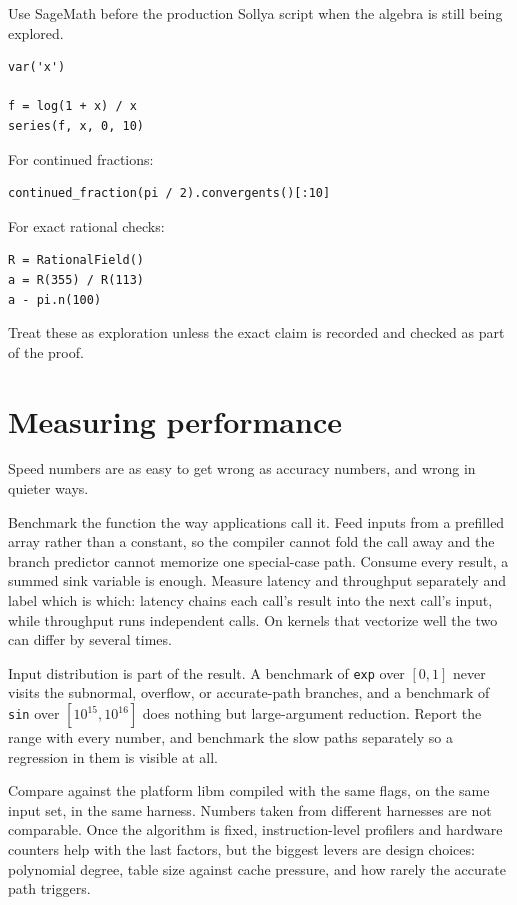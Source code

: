 \documentclass[manuscript, nonacm]{acmart}
\begin{document}
    Use SageMath before the production Sollya script when the algebra is still
    being explored.

    \begin{lstlisting}[style=shell]
var('x')

f = log(1 + x) / x
series(f, x, 0, 10)
    \end{lstlisting}

    For continued fractions:
    \begin{lstlisting}[style=shell]
continued_fraction(pi / 2).convergents()[:10]
    \end{lstlisting}

    For exact rational checks:
    \begin{lstlisting}[style=shell]
R = RationalField()
a = R(355) / R(113)
a - pi.n(100)
    \end{lstlisting}

    Treat these as exploration unless the exact claim is recorded and checked as
    part of the proof.



    \section{Measuring performance}

    Speed numbers are as easy to get wrong as accuracy numbers, and wrong in
    quieter ways.

    Benchmark the function the way applications call it. Feed inputs from a
    prefilled array rather than a constant, so the compiler cannot fold the
    call away and the branch predictor cannot memorize one special-case
    path. Consume every result, a summed sink variable is enough. Measure
    latency and throughput separately and label which is which: latency
    chains each call's result into the next call's input, while throughput
    runs independent calls. On kernels that vectorize well the two can
    differ by several times.

    Input distribution is part of the result. A benchmark of
    \texttt{exp} over $[0, 1]$ never visits the subnormal, overflow, or
    accurate-path branches, and a benchmark of \texttt{sin} over
    $[10^{15}, 10^{16}]$ does nothing but large-argument reduction. Report
    the range with every number, and benchmark the slow paths separately so
    a regression in them is visible at all.

    Compare against the platform libm compiled with the same flags, on the
    same input set, in the same harness. Numbers taken from different
    harnesses are not comparable. Once the algorithm is fixed,
    instruction-level profilers and hardware counters help with the last
    factors, but the biggest levers are design choices: polynomial degree,
    table size against cache pressure, and how rarely the accurate path
    triggers.
\end{document}
